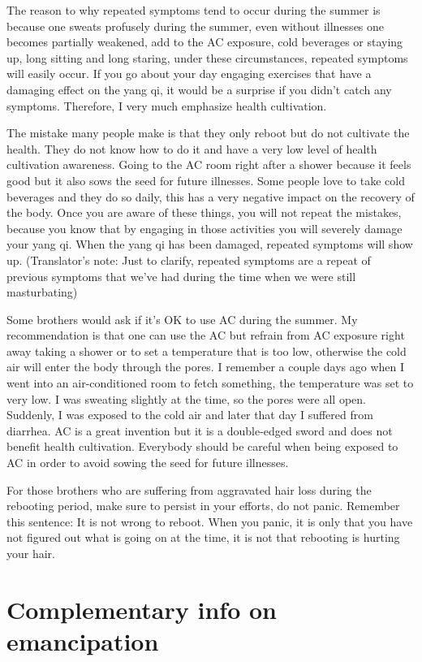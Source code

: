 \documentclass[
]{book}
\begin{document}
The reason to why repeated symptoms tend to occur during the summer is because one sweats profusely during the summer, even without illnesses one becomes partially weakened, add to the AC exposure, cold beverages or staying up, long sitting and long staring, under these circumstances, repeated symptoms will easily occur. If you go about your day engaging exercises that have a damaging effect on the yang qi, it would be a surprise if you didn't catch any symptoms. Therefore, I very much emphasize health cultivation.

The mistake many people make is that they only reboot but do not cultivate the health. They do not know how to do it and have a very low level of health cultivation awareness. Going to the AC room right after a shower because it feels good but it also sows the seed for future illnesses. Some people love to take cold beverages and they do so daily, this has a very negative impact on the recovery of the body. Once you are aware of these things, you will not repeat the mistakes, because you know that by engaging in those activities you will severely damage your yang qi. When the yang qi has been damaged, repeated symptoms will show up. (Translator's note: Just to clarify, repeated symptoms are a repeat of previous symptoms that we've had during the time when we were still masturbating)

Some brothers would ask if it's OK to use AC during the summer. My recommendation is that one can use the AC but refrain from AC exposure right away taking a shower or to set a temperature that is too low, otherwise the cold air will enter the body through the pores. I remember a couple days ago when I went into an air-conditioned room to fetch something, the temperature was set to very low. I was sweating slightly at the time, so the pores were all open. Suddenly, I was exposed to the cold air and later that day I suffered from diarrhea. AC is a great invention but it is a double-edged sword and does not benefit health cultivation. Everybody should be careful when being exposed to AC in order to avoid sowing the seed for future illnesses.

For those brothers who are suffering from aggravated hair loss during the rebooting period, make sure to persist in your efforts, do not panic. Remember this sentence: It is not wrong to reboot. When you panic, it is only that you have not figured out what is going on at the time, it is not that rebooting is hurting your hair.

\hypertarget{complementary-info-on-emancipation}{%
\section{Complementary info on emancipation}\label{complementary-info-on-emancipation}}
\end{document}

